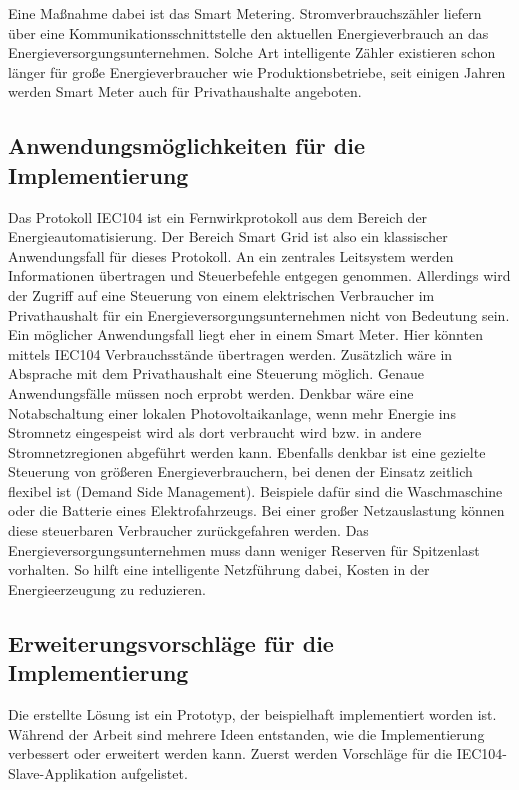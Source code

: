 Eine Maßnahme dabei ist das Smart Metering. Stromverbrauchszähler liefern über eine Kommunikationsschnittstelle den aktuellen Energieverbrauch an das Energieversorgungsunternehmen. Solche Art intelligente Zähler existieren schon länger für große Energieverbraucher wie Produktionsbetriebe, seit einigen Jahren werden Smart Meter auch für Privathaushalte angeboten.


\subsection{Anwendungsmöglichkeiten für die Implementierung}


Das Protokoll IEC104 ist ein Fernwirkprotokoll aus dem Bereich der Energieautomatisierung. Der Bereich Smart Grid ist also ein klassischer Anwendungsfall für dieses Protokoll. An ein zentrales Leitsystem werden Informationen übertragen und Steuerbefehle entgegen genommen. Allerdings wird der Zugriff auf eine Steuerung von einem elektrischen Verbraucher im Privathaushalt für ein Energieversorgungsunternehmen nicht von Bedeutung sein. Ein möglicher Anwendungsfall liegt eher in einem Smart Meter. Hier könnten mittels IEC104 Verbrauchsstände übertragen werden. Zusätzlich wäre in Absprache mit dem Privathaushalt eine Steuerung möglich. Genaue Anwendungsfälle müssen noch erprobt werden. Denkbar wäre eine Notabschaltung einer lokalen Photovoltaikanlage, wenn mehr Energie ins Stromnetz eingespeist wird als dort verbraucht wird bzw. in andere Stromnetzregionen abgeführt werden kann. Ebenfalls denkbar ist eine gezielte Steuerung von größeren Energieverbrauchern, bei denen der Einsatz zeitlich flexibel ist (Demand Side Management). Beispiele dafür sind die Waschmaschine oder die Batterie eines Elektrofahrzeugs. Bei einer großer Netzauslastung können diese steuerbaren Verbraucher zurückgefahren werden. Das Energieversorgungsunternehmen muss dann weniger Reserven für Spitzenlast vorhalten. So hilft eine intelligente Netzführung dabei, Kosten in der Energieerzeugung zu reduzieren.

\subsection{Erweiterungsvorschläge für die Implementierung}

Die erstellte Lösung ist ein Prototyp, der beispielhaft implementiert worden ist. Während der Arbeit sind mehrere Ideen entstanden, wie die Implementierung verbessert oder erweitert werden kann. Zuerst werden Vorschläge für die IEC104-Slave-Applikation aufgelistet.

